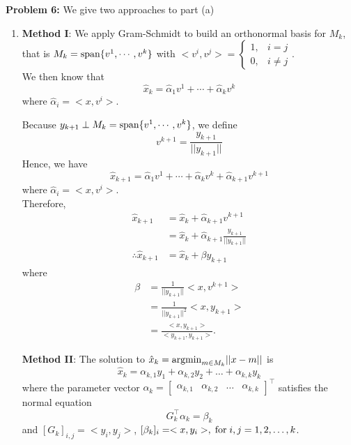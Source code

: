 \documentclass[letterpaper]{article}
\begin{document}
\noindent \textbf{Problem 6:} We give two approaches to part (a)
\begin{enumerate}
\setlength{\itemsep}{.1in}
\renewcommand{\labelenumi}{(\alph{enumi})}
\item {\bf Method I}:
We apply Gram-Schmidt to build an orthonormal basis for $M_k$, that is $M_k=\textrm{span} \{ v^1,\cdots,v^k \}$ with $<v^i,v^j>=\left\{\begin{array}{ll}
1, & i=j\\
0, & i\not=j
\end{array}\right.$. \\[2ex]
We then know that
$$\hat{x}_k=\hat{\alpha}_1 v^1 + \cdots + \hat{\alpha}_k v^k$$
where $\hat{\alpha}_i =<x,v^i>$.

Because $y_{k+1} \perp M_k = \textrm{span} \{ v^1,\cdots,v^k \}$, we define
$$v^{k+1}=\frac{y_{k+1}}{||y_{k+1}||}$$
Hence, we have
$$\hat{x}_{k+1}=\hat{\alpha}_1 v^1 + \cdots + \hat{\alpha}_k v^k+ \hat{\alpha}_{k+1} v^{k+1}$$
where $\hat{\alpha}_i=<x,v^i>$.\\
Therefore,
$$\begin{aligned}
\hat{x}_{k+1}&=\hat{x}_k +\hat{\alpha}_{k+1}v^{k+1} \\
&=\hat{x}_k + \hat{\alpha}_{k+1} \frac{y_{k+1}}{||y_{k+1}||} \\
\therefore \hat{x}_{k+1}&=\hat{x}_{k}+\beta y_{k+1}
\end{aligned}$$
where $$\begin{aligned}
\beta&=\frac{1}{||y_{k+1}||}<x,v^{k+1}> \\
&=\frac{1}{||y_{k+1}||^2}<x,y_{k+1}> \\
&=\frac{<x,y_{k+1}>}{<y_{k+1},y_{k+1}>}.
\end{aligned}$$

\newpage

{\bf Method II}:
The solution to $\hat{x}_{k}={\rm arg min}_{m\in M_{k}}||x-m||$ is
\begin{equation*}
  \hat{x}_{k} = \alpha_{k,1}y_{1}+\alpha_{k,2}y_{2}+\ldots+\alpha_{k,k}y_{k}
\end{equation*}
where the parameter vector $\alpha_{k} =\begin{bmatrix}\alpha_{k,1} & \alpha_{k,2} & \ldots &\alpha_{k,k}\end{bmatrix}^{\top}$ satisfies the normal equation
\begin{equation*}
    G_{k}^{\top}\alpha_{k}=\beta_{k}
\end{equation*}
and $[G_{k}]_{i,j}=<y_{i}, y_{j}>$, $[\beta_{k}]_{i}=<x, y_{i}>, \;{\rm for }\;i,j=1,2,\ldots, k$.\\


\end{enumerate}
\end{document}
